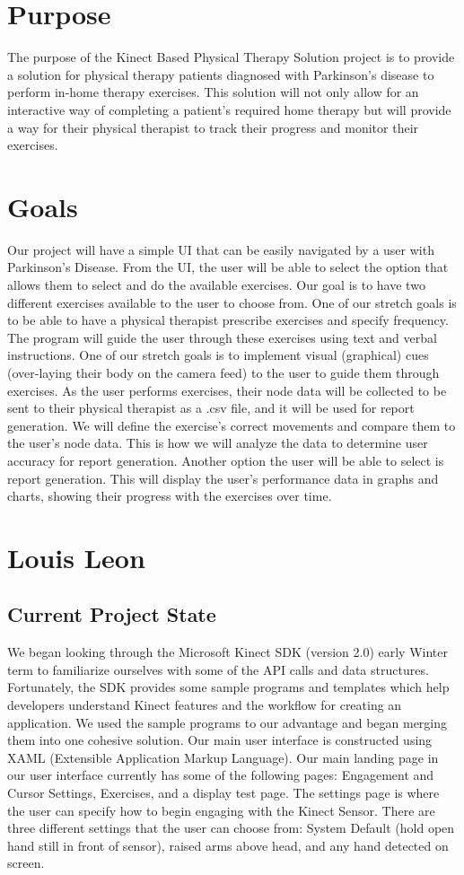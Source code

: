 \documentclass[onecolumn, draftclsnofoot,10pt, compsoc]{IEEEtran}
\begin{document}
\section{Purpose}
The purpose of the Kinect Based Physical Therapy Solution project is to provide a solution for physical therapy patients diagnosed with Parkinson's disease to perform in-home therapy exercises. This solution will not only allow for an interactive way of completing a patient's required home therapy but will provide a way for their physical therapist to track their progress and monitor their exercises.

\section{Goals}
Our project will have a simple UI that can be easily navigated by a user with Parkinson's Disease. From the UI, the user will be able to select the option that allows them to select and do the available exercises. Our goal is to have two different exercises available to the user to choose from. One of our stretch goals is to be able to have a physical therapist prescribe exercises and specify frequency. The program will guide the user through these exercises using text and verbal instructions. One of our stretch goals is to implement visual (graphical) cues (over-laying their body on the camera feed) to the user to guide them through exercises. As the user performs exercises, their node data will be collected to be sent to their physical therapist as a .csv file, and it will be used for report generation. We will define the exercise's correct movements and compare them to the user's node data. This is how we will analyze the data to determine user accuracy for report generation. Another option the user will be able to select is report generation. This will display the user's performance data in graphs and charts, showing their progress with the exercises over time. 

\section{Louis Leon}
\subsection{Current Project State}
We began looking through the Microsoft Kinect SDK (version 2.0) early Winter term to familiarize ourselves with some of the API calls and data structures. Fortunately, the SDK provides some sample programs and templates which help developers understand Kinect features and the workflow for creating an application. We used the sample programs to our advantage and began merging them into one cohesive solution. Our main user interface is constructed using XAML (Extensible Application Markup Language). Our main landing page in our user interface currently has some of the following pages: Engagement and Cursor Settings, Exercises, and a display test page. The settings page is where the user can specify how to begin engaging with the Kinect Sensor. There are three different settings that the user can choose from: System Default (hold open hand still in front of sensor), raised arms above head, and any hand detected on screen.
\end{document}
